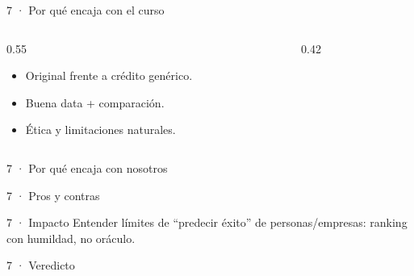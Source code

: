 \begin{frame}{7 · Por qué encaja con el curso}
  \begin{columns}[T]
    \begin{column}{0.55\textwidth}
      \begin{itemize}
        \item Original frente a crédito genérico.
        \item Buena data + comparación.
        \item Ética y limitaciones naturales.
      \end{itemize}
    \end{column}
    \begin{column}{0.42\textwidth}
    \end{column}
  \end{columns}
\end{frame}

\begin{frame}{7 · Por qué encaja con nosotros}
\end{frame}

\begin{frame}{7 · Pros y contras}
\end{frame}

\begin{frame}{7 · Impacto}
  Entender límites de ``predecir éxito'' de personas/empresas: ranking con humildad, no oráculo.
\end{frame}

\begin{frame}{7 · Veredicto}
\end{frame}
